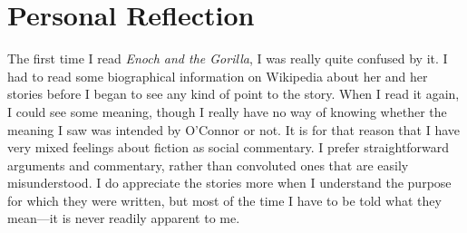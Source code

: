\documentclass[onecolumn, 12pt]{article}
\begin{document}
\section*{Personal Reflection}

The first time I read \emph{Enoch and the Gorilla}, I was really quite confused
by it.  I had to read some biographical information on Wikipedia about her and
her stories before I began to see any kind of point to the story.  When I read
it again, I could see some meaning, though I really have no way of knowing
whether the meaning I saw was intended by O'Connor or not.  It is for that
reason that I have very mixed feelings about fiction as social commentary.  I
prefer straightforward arguments and commentary, rather than convoluted ones
that are easily misunderstood.  I do appreciate the stories more when I
understand the purpose for which they were written, but most of the time I have
to be told what they mean---it is never readily apparent to me.
\end{document}

